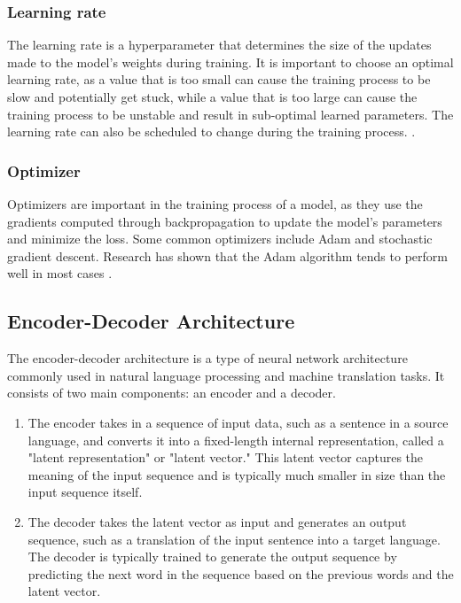 \documentclass{report}
\begin{document}
	\subsubsection{Learning rate}
	
	The learning rate is a hyperparameter that determines the size of the updates made to the model's weights during training. It is important to choose an optimal learning rate, as a value that is too small can cause the training process to be slow and potentially get stuck, while a value that is too large can cause the training process to be unstable and result in sub-optimal learned parameters. The learning rate can also be scheduled to change during the training process. \cite{senior2013empirical}. 
	
	
	\subsubsection{Optimizer}
	
	Optimizers are important in the training process of a model, as they use the gradients computed through backpropagation to update the model's parameters and minimize the loss. Some common optimizers include Adam and stochastic gradient descent. Research has shown that the Adam algorithm tends to perform well in most cases \cite{zaheer2019study}.
	
	\subsection{Encoder-Decoder Architecture}
	The encoder-decoder architecture is a type of neural network architecture commonly used in natural language processing and machine translation tasks. It consists of two main components: an encoder and a decoder.
	\begin{enumerate}
		\item The encoder takes in a sequence of input data, such as a sentence in a source language, and converts it into a fixed-length internal representation, called a "latent representation" or "latent vector." This latent vector captures the meaning of the input sequence and is typically much smaller in size than the input sequence itself.
		\item The decoder takes the latent vector as input and generates an output sequence, such as a translation of the input sentence into a target language. The decoder is typically trained to generate the output sequence by predicting the next word in the sequence based on the previous words and the latent vector.
	\end{enumerate}
	
\end{document}
